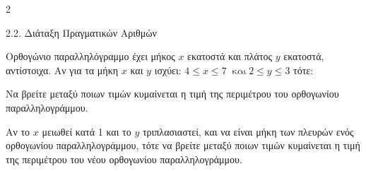 \begin{ylh}{2}
    \item 2.2. Διάταξη Πραγματικών Αριθμών
\end{ylh}
Ορθογώνιο παραλληλόγραμμο έχει μήκος $x$ εκατοστά και πλάτος $y$ εκατοστά, αντίστοιχα. Αν για τα μήκη $x$ και $y$ ισχύει: $4 \leq x \leq 7\ \text{ και}\ 2 \leq y \leq 3$ τότε:

\begin{alist}
\item Να βρείτε μεταξύ ποιων τιμών κυμαίνεται η τιμή της περιμέτρου του ορθογωνίου παραλληλογράμμου.

\item Αν το $x$ μειωθεί κατά 1 και το $y$ τριπλασιαστεί, και να είναι μήκη των πλευρών ενός ορθογωνίου παραλληλογράμμου, τότε να βρείτε μεταξύ ποιων τιμών κυμαίνεται η τιμή της περιμέτρου του νέου ορθογωνίου παραλληλογράμμου.

\end{alist}

